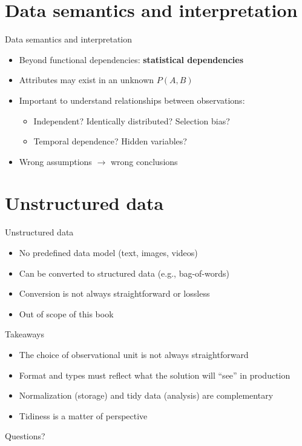 \section{Data semantics and interpretation}

\begin{frame}{Data semantics and interpretation}
  \begin{itemize}
    \item Beyond functional dependencies: \textbf{statistical dependencies}
    \item Attributes may exist in an unknown $P(A, B)$
    \item Important to understand relationships between observations:
      \begin{itemize}
        \item Independent? Identically distributed? Selection bias?
        \item Temporal dependence? Hidden variables?
      \end{itemize}
    \item Wrong assumptions $\to$ wrong conclusions
  \end{itemize}
\end{frame}

\section{Unstructured data}

\begin{frame}{Unstructured data}
  \begin{itemize}
    \item No predefined data model (text, images, videos)
    \item Can be converted to structured data (e.g., bag-of-words)
    \item Conversion is not always straightforward or lossless
    \item Out of scope of this book
  \end{itemize}
\end{frame}


\begin{frame}{Takeaways}
  \begin{itemize}
    \item The choice of observational unit is not always straightforward
    \item Format and types must reflect what the solution will ``see'' in
      production
    \item Normalization (storage) and tidy data (analysis) are complementary
    \item Tidiness is a matter of perspective
  \end{itemize}
\end{frame}


\begin{frame}[standout]
  Questions?
\end{frame}



